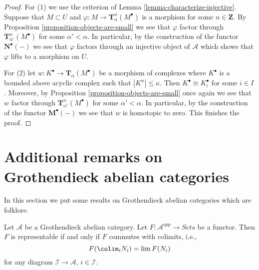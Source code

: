 \begin{proof}
\medskip\noindent
For (1) we use the criterion of
Lemma \ref{lemma-characterize-injective}.
Suppose that $M \subset U$ and $\varphi : M \to \mathbf{T}^n_\alpha(M^\bullet)$
is a morphism for some $n \in \mathbf{Z}$. By
Proposition \ref{proposition-objects-are-small}
we see that $\varphi$ factor through
$\mathbf{T}^n_{\alpha'}(M^\bullet)$ for some $\alpha' < \alpha$.
In particular, by the construction of the functor
$\mathbf{N}^\bullet(-)$ we see that $\varphi$ factors through
an injective object of $\mathcal{A}$ which shows that $\varphi$
lifts to a morphism on $U$.

\medskip\noindent
For (2) let $w : K^\bullet  \to \mathbf{T}_\alpha(M^\bullet)$
be a morphism of complexes where $K^\bullet$ is a bounded above acyclic
complex such that $|K^n| \leq \kappa$. Then $K^\bullet \cong K_i^\bullet$
for some $i \in I$. Moreover, by
Proposition \ref{proposition-objects-are-small}
once again we see that $w$ factor through
$\mathbf{T}^n_{\alpha'}(M^\bullet)$ for some $\alpha' < \alpha$.
In particular, by the construction of the functor
$\mathbf{M}^\bullet(-)$ we see that $w$ is homotopic to zero.
This finishes the proof.
\end{proof}







\section{Additional remarks on Grothendieck abelian categories}
\label{section-additional-Grothendieck}

\noindent
In this section we put some results on Grothendieck abelian categories
which are folklore.

\begin{lemma}
\label{lemma-grothendieck-brown}
Let $\mathcal{A}$ be a Grothendieck abelian category.
Let $F : \mathcal{A}^{opp} \to \textit{Sets}$ be a functor.
Then $F$ is representable if and only if $F$ commutes with colimits, i.e.,
$$
F(\colim_i N_i) = \lim F(N_i)
$$
for any diagram $\mathcal{I} \to \mathcal{A}$, $i \in \mathcal{I}$.
\end{lemma}


